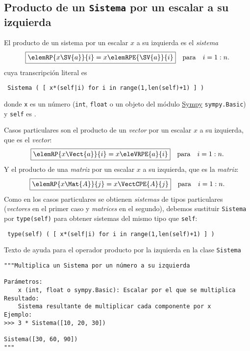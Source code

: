 \documentclass[11pt]{report}
\begin{document}
\subsection{Producto de un \texttt{Sistema} por un escalar a su izquierda}
\label{sec:org96e3a29}

El producto de un sistema  por un escalar \(x\) a su izquierda es
el \emph{sistema}
\begin{displaymath}
  \fbox{\begin{math} 
      \elemRP{x\SV{a}}{i}=x \elemRPE{\SV{a}}{i}
  \end{math}}\quad\text{para}\quad i=1:n.
\end{displaymath}
cuya transcripción literal es
\begin{center}
  \Verb/ Sistema ( [ x*(self|i) for i in range(1,len(self)+1) ] ) /
\end{center}

donde \texttt{x} es un número (\texttt{int}, \texttt{float} o un objeto del módulo \href{https://docs.sympy.org/latest/index.html}{Sympy}
\texttt{sympy.Basic}) y \texttt{self} es .

Casos particulares son el producto de un \emph{vector} 
por un escalar \(x\) a su izquierda, que es el \emph{vector}:
\begin{displaymath}
  \fbox{\begin{math} 
      \elemRP{x\Vect{a}}{i}=x \eleVRPE{a}{i}
  \end{math}}\quad\text{para}\quad i=1:n.
\end{displaymath}
Y el producto de una \emph{matriz}  por un escalar \(x\) a su
izquierda, que es la \emph{matriz}:
\begin{displaymath}
  \fbox{\begin{math} 
      \elemRP{x\Mat{A}}{j}=x\VectCPE{A}{j}
    \end{math}}\quad\text{para}\quad i=1:n.
\end{displaymath}
Como en los casos particulares se obtienen \emph{sistemas} de tipos
particulares (\emph{vectores} en el primer caso y \emph{matrices} en el
segundo), debemos sustituir \texttt{Sistema} por \texttt{type(self)} para
obtener sistemas del mismo tipo que \texttt{self}:
\begin{center}
  \Verb/ type(self) ( [ x*(self|i) for i in range(1,len(self)+1) ] ) /
\end{center}

Texto de ayuda para el operador producto por la izquierda en la clase \texttt{Sistema}
\begin{verbatim}
"""Multiplica un Sistema por un número a su izquierda

Parámetros:
    x (int, float o sympy.Basic): Escalar por el que se multiplica
Resultado:
    Sistema resultante de multiplicar cada componente por x
Ejemplo:
>>> 3 * Sistema([10, 20, 30]) 

Sistema([30, 60, 90]) 
"""
\end{verbatim}
\end{document}
